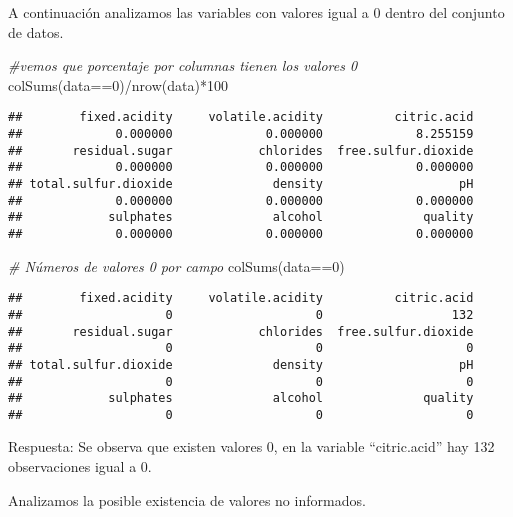 \documentclass[
]{article}
\newenvironment{Shaded}{\begin{snugshade}}{\end{snugshade}}
\newcommand{\CommentTok}[1]{\textcolor[rgb]{0.56,0.35,0.01}{\textit{#1}}}
\newcommand{\DecValTok}[1]{\textcolor[rgb]{0.00,0.00,0.81}{#1}}
\newcommand{\FunctionTok}[1]{\textcolor[rgb]{0.00,0.00,0.00}{#1}}
\newcommand{\NormalTok}[1]{#1}
\newcommand{\SpecialCharTok}[1]{\textcolor[rgb]{0.00,0.00,0.00}{#1}}
\begin{document}
A continuación analizamos las variables con valores igual a 0 dentro del
conjunto de datos.

\begin{Shaded}
\begin{Highlighting}[]
\CommentTok{\#vemos que porcentaje por columnas tienen los valores 0}
\FunctionTok{colSums}\NormalTok{(data}\SpecialCharTok{==}\DecValTok{0}\NormalTok{)}\SpecialCharTok{/}\FunctionTok{nrow}\NormalTok{(data)}\SpecialCharTok{*}\DecValTok{100}
\end{Highlighting}
\end{Shaded}

\begin{verbatim}
##        fixed.acidity     volatile.acidity          citric.acid 
##             0.000000             0.000000             8.255159 
##       residual.sugar            chlorides  free.sulfur.dioxide 
##             0.000000             0.000000             0.000000 
## total.sulfur.dioxide              density                   pH 
##             0.000000             0.000000             0.000000 
##            sulphates              alcohol              quality 
##             0.000000             0.000000             0.000000
\end{verbatim}

\begin{Shaded}
\begin{Highlighting}[]
\CommentTok{\# Números de valores 0 por campo}
\FunctionTok{colSums}\NormalTok{(data}\SpecialCharTok{==}\DecValTok{0}\NormalTok{)}
\end{Highlighting}
\end{Shaded}

\begin{verbatim}
##        fixed.acidity     volatile.acidity          citric.acid 
##                    0                    0                  132 
##       residual.sugar            chlorides  free.sulfur.dioxide 
##                    0                    0                    0 
## total.sulfur.dioxide              density                   pH 
##                    0                    0                    0 
##            sulphates              alcohol              quality 
##                    0                    0                    0
\end{verbatim}

Respuesta: Se observa que existen valores 0, en la variable
``citric.acid'' hay 132 observaciones igual a 0.

Analizamos la posible existencia de valores no informados.
\end{document}
